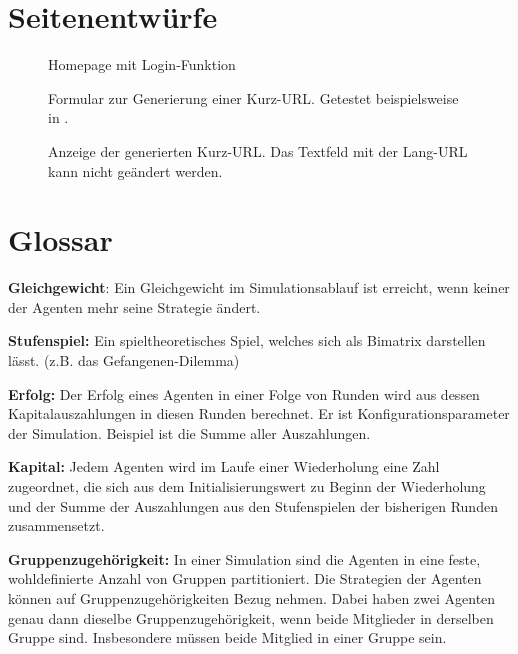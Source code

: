 \documentclass[parskip=full,11pt,twoside]{scrartcl}
\begin{document}
\appendix

\section{Seitenentwürfe}


\begin{figure}[hb]
\caption{\label{fig:homepage}
Homepage mit Login-Funktion
}
\end{figure}

\begin{figure}[hb]
\caption{\label{fig:form}
Formular zur Generierung einer Kurz-URL.
Getestet beispielsweise in .
}
\end{figure}

\begin{figure}[hb]
\caption{\label{fig:generated}
Anzeige der generierten Kurz-URL.
Das Textfeld mit der Lang-URL kann nicht geändert werden.
}
\end{figure}

\section{Glossar}

\textbf{Gleichgewicht}:
Ein Gleichgewicht im Simulationsablauf ist erreicht, wenn keiner der Agenten mehr seine Strategie ändert.

\textbf{Stufenspiel:}
Ein spieltheoretisches Spiel, welches sich als Bimatrix darstellen lässt. (z.B. das Gefangenen-Dilemma)

\textbf{Erfolg:}
Der Erfolg eines Agenten in einer Folge von Runden wird aus dessen Kapitalauszahlungen in diesen Runden berechnet. Er ist Konfigurationsparameter der Simulation. Beispiel ist die Summe aller Auszahlungen.

\textbf{Kapital:}
Jedem Agenten wird im Laufe einer Wiederholung eine Zahl zugeordnet, die sich aus dem Initialisierungswert zu Beginn der Wiederholung und der Summe der Auszahlungen aus den Stufenspielen der bisherigen Runden zusammensetzt.

\textbf{Gruppenzugehörigkeit:}
In einer Simulation sind die Agenten in eine feste, wohldefinierte Anzahl von Gruppen partitioniert. Die Strategien der Agenten können auf Gruppenzugehörigkeiten Bezug nehmen. Dabei haben zwei Agenten genau dann dieselbe Gruppenzugehörigkeit, wenn beide Mitglieder in derselben Gruppe sind. Insbesondere müssen beide Mitglied in einer Gruppe sein.
\end{document}
